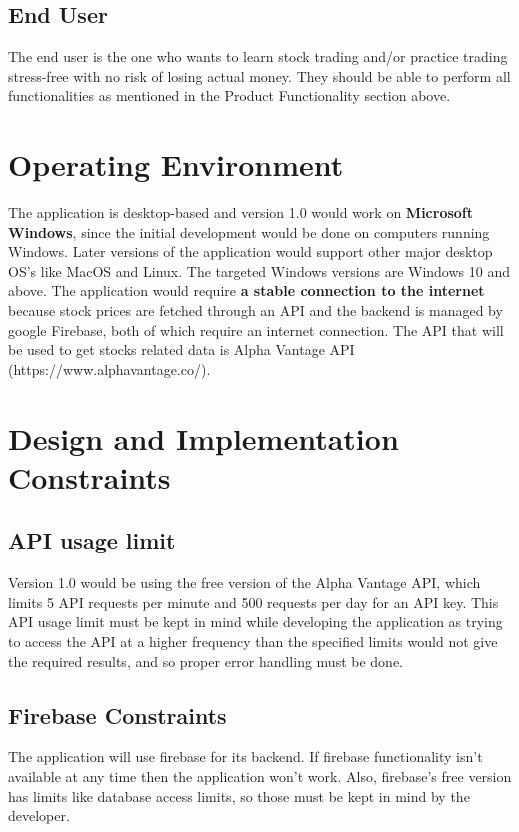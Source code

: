 \documentclass[12 pt, a4paper]{report}
\begin{document}
	\subsection{End User}
	The end user is the one who wants to learn stock trading and/or practice trading stress-free with no risk of losing actual money. They should be able to perform all functionalities as mentioned in the Product Functionality section above.
	
	\section {Operating Environment}

	The application is desktop-based and version 1.0 would work on \textbf{Microsoft Windows}, since the initial development would be done on computers running Windows. Later versions of the application would support other major desktop OS's like MacOS and Linux. The targeted Windows versions are Windows 10 and above. The application would require \textbf{a stable connection to the internet} because stock prices are fetched through an API and the backend is managed by google Firebase, both of which require an internet connection. The API that will be used to get stocks related data is Alpha Vantage API (https://www.alphavantage.co/).
	
	\section {Design and Implementation Constraints}
	
	\subsection{API usage limit}
	Version 1.0 would be using the free version of the Alpha Vantage API, which limits 5 API requests per minute and 500 requests per day for an API key. This API usage limit must be kept in mind while developing the application as trying to access the API at a higher frequency than the specified limits would not give the required results, and so proper error handling must be done.
	
	\subsection{Firebase Constraints}
	The application will use firebase for its backend. If firebase functionality isn't available at any time then the application won't work. Also, firebase's free version has limits like database access limits, so those must be kept in mind by the developer.
	
\end{document}
